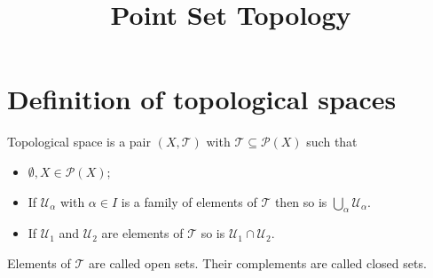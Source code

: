 \documentclass[11pt]{amsart}
\newcommand{\<}{\langle}
\renewcommand{\>}{\rangle}
\newcommand{\U}{\mathcal{U}}
\newcommand{\T}{\mathcal{T}}
\begin{document}
\title{Point Set Topology}

%

\date{}

\keywords{}

\maketitle

\section{Definition of topological spaces}
\noindent Topological space is a pair $(X, \T)$ with $\T\subseteq \mathcal{P}(X)$ such that 
\begin{itemize}
\item $\emptyset, X \in \mathcal{P}(X)$;
\medbreak
\item If $\U_\alpha$ with $\alpha \in I$ is a family of elements of $\T$ then so is $\bigcup_\alpha \U_\alpha$.
\medbreak
\item If $\U_1$ and $\U_2$ are elements of $\T$ so is $\U_1\cap \U_2$.
\end{itemize}
Elements of $\T$ are called open sets. Their complements are called closed sets. 
\end{document}
